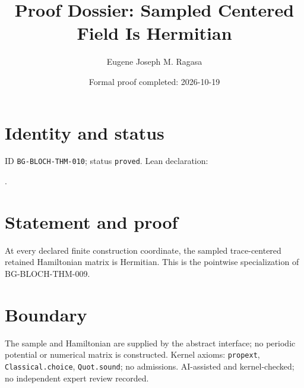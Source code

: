 \documentclass[11pt]{article}
\title{Proof Dossier: Sampled Centered Field Is Hermitian}\author{Eugene Joseph M. Ragasa}\date{Formal proof completed: 2026-10-19}
\begin{document}
\maketitle
\section{Identity and status}
ID \texttt{BG-BLOCH-THM-010}; status \texttt{proved}. Lean declaration:
\par{}.
\section{Statement and proof}
At every declared finite construction coordinate, the sampled trace-centered retained
Hamiltonian matrix is Hermitian. This is the pointwise specialization of
BG-BLOCH-THM-009.
\section{Boundary}
The sample and Hamiltonian are supplied by the abstract interface; no periodic potential
or numerical matrix is constructed. Kernel axioms: \texttt{propext},
\texttt{Classical.choice}, \texttt{Quot.sound}; no admissions. AI-assisted and
kernel-checked; no independent expert review recorded.
\end{document}
